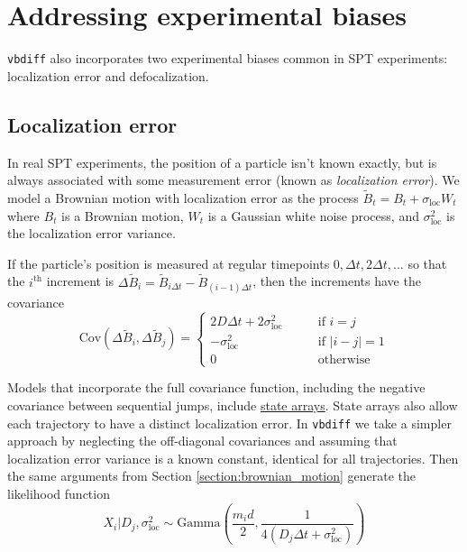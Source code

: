 \documentclass{article}
\begin{document}
\section{Addressing experimental biases}

\verb|vbdiff| also incorporates two experimental biases common
in SPT experiments: localization error and defocalization.

\subsection{Localization error}

In real SPT experiments, the position of a particle isn't known exactly,
but is always associated with some measurement error (known as
\emph{localization error}). We model a Brownian motion with
localization error as the process $\tilde{B}_{t} = B_{t} + \sigma_{\text{loc}} W_{t}$
where $B_{t}$ is a Brownian motion, $W_{t}$ is a Gaussian white noise process,
and $\sigma_{\text{loc}}^{2}$ is the localization error variance. \newline

If the particle's position is measured at regular timepoints $0, \Delta t, 2 \Delta t, ...$
so that the $i^{\text{th}}$ increment is $\Delta \tilde{B}_{i} = \tilde{B}_{i \Delta t} - \tilde{B}_{(i-1) \Delta t}$, then the increments have the covariance
\[
    \text{Cov} \left( \Delta \tilde{B}_{i}, \Delta \tilde{B}_{j} \right) = \begin{cases}
        2 D \Delta t + 2 \sigma_{\text{loc}}^{2} \qquad &\text{if } i = j \\
        - \sigma_{\text{loc}}^{2} \qquad &\text{if } \left| i - j \right| = 1 \\
        0 \qquad &\text{otherwise}
    \end{cases}
\]

Models that incorporate the full covariance function, including the negative
covariance between sequential jumps, include \href{https://github.com/alecheckert/saspt}{state arrays}. State arrays also allow each trajectory to have a distinct
localization error. In \verb|vbdiff| we take a simpler approach by neglecting the
off-diagonal covariances and assuming that localization error variance is a known
constant, identical for all trajectories. Then the same arguments
from Section \ref{section:brownian_motion} generate the likelihood function
\begin{equation}
    X_{i} | D_{j}, \sigma_{\text{loc}}^{2} \sim \text{Gamma} \left( \frac{m_{i} d}{2}, \frac{1}{4 (D_{j} \Delta t + \sigma_{\text{loc}}^{2} )} \right)
\end{equation}
\end{document}
